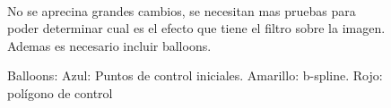 \documentclass[a4paper,10pt]{article}
\begin{document}
\begin{figure}[ht!]
  \centering
  ~ 
  ~ 
  \caption{Balloons: Azul: Puntos de control iniciales. Amarillo: b-spline.  Rojo: polígono de control}
  \label{fig:p4}

No se aprecina grandes cambios, se necesitan mas pruebas para poder determinar cual es el efecto que tiene el filtro sobre la imagen. Ademas es necesario incluir balloons.
\end{figure}
\end{document}
